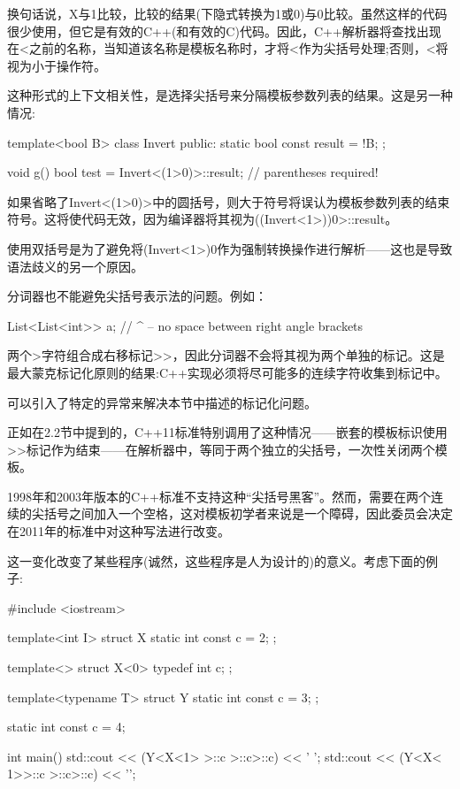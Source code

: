 换句话说，X与1比较，比较的结果(下隐式转换为1或0)与0比较。虽然这样的代码很少使用，但它是有效的C++(和有效的C)代码。因此，C++解析器将查找出现在<之前的名称，当知道该名称是模板名称时，才将<作为尖括号处理;否则，<将视为小于操作符。

这种形式的上下文相关性，是选择尖括号来分隔模板参数列表的结果。这是另一种情况:

\begin{cpp}
template<bool B>
class Invert {
public:
	static bool const result = !B;
};

void g()
{
	bool test = Invert<(1>0)>::result; // parentheses required!
}
\end{cpp}

如果省略了Invert<(1>0)>中的圆括号，则大于符号将误认为模板参数列表的结束符号。这将使代码无效，因为编译器将其视为((Invert<1>))0>::result。

\begin{notice}使用双括号是为了避免将(Invert<1>)0作为强制转换操作进行解析——这也是导致语法歧义的另一个原因。
\end{notice}

分词器也不能避免尖括号表示法的问题。例如：

\begin{cpp}
List<List<int>> a;
			 // ^ -- no space between right angle brackets
\end{cpp}

两个>字符组合成右移标记>{}>，因此分词器不会将其视为两个单独的标记。这是最大蒙克标记化原则的结果:C++实现必须将尽可能多的连续字符收集到标记中。

\begin{notice}可以引入了特定的异常来解决本节中描述的标记化问题。
\end{notice}

正如在2.2节中提到的，C++11标准特别调用了这种情况——嵌套的模板标识使用>{}>标记作为结束——在解析器中，等同于两个独立的尖括号，一次性关闭两个模板。

\begin{notice}1998年和2003年版本的C++标准不支持这种“尖括号黑客”。然而，需要在两个连续的尖括号之间加入一个空格，这对模板初学者来说是一个障碍，因此委员会决定在2011年的标准中对这种写法进行改变。
\end{notice}

这一变化改变了某些程序(诚然，这些程序是人为设计的)的意义。考虑下面的例子:

\begin{cpp}
#include <iostream>

template<int I> struct X {
	static int const c = 2;
};

template<> struct X<0> {
	typedef int c;
};

template<typename T> struct Y {
	static int const c = 3;
};

static int const c = 4;

int main()
{
	std::cout << (Y<X<1> >::c >::c>::c) << ’ ’;
	std::cout << (Y<X< 1>>::c >::c>::c) << ’\n’;
}
\end{cpp}

